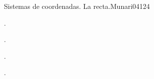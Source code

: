 \begin{syllabus}
\begin{unit}{Sistemas de coordenadas. La recta.}{Munari04}{12}{4}
   \begin{topics}
      \item .
      \item .
      \item .
   \end{topics}
   \begin{unitgoals}
      \item .
   \end{unitgoals}
\end{unit}


\begin{coursebibliography}
\end{coursebibliography}

\end{syllabus}
